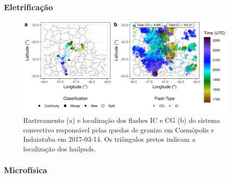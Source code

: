 \subsubsection{Eletrificação}\label{elec_201703014}

\begin{figure}[htb]
	\begin{center}
		\caption{Rastreamento (a) e localização dos flashes IC e CG (b) do sistema convectivo responsável pelas quedas de granizo em Cosmópolis e Indaiatuba em 2017-03-14. Os triângulos pretos indicam a localização dos hailpads.} 
		\label{track_flashes_20170314}
		\includegraphics[width=\columnwidth]{../General_Processing/figures/track_flashes_20170314.png}
	\end{center}
\end{figure}

\subsubsection{Microfísica}\label{micro_201703014}

